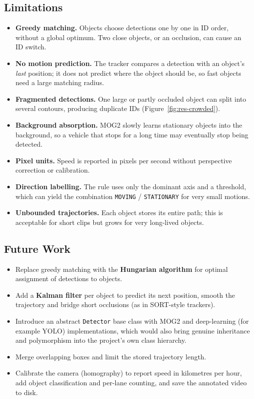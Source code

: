 \documentclass[12pt,a4paper,oneside]{book}
\begin{document}
\subsection{Limitations}
\begin{itemize}
    \item \textbf{Greedy matching.} Objects choose detections one by one in ID order, without a global optimum. Two close objects, or an occlusion, can cause an ID switch.
    \item \textbf{No motion prediction.} The tracker compares a detection with an object's \emph{last} position; it does not predict where the object should be, so fast objects need a large matching radius.
    \item \textbf{Fragmented detections.} One large or partly occluded object can split into several contours, producing duplicate IDs (Figure~\ref{fig:res-crowded}).
    \item \textbf{Background absorption.} MOG2 slowly learns stationary objects into the background, so a vehicle that stops for a long time may eventually stop being detected.
    \item \textbf{Pixel units.} Speed is reported in pixels per second without perspective correction or calibration.
    \item \textbf{Direction labelling.} The rule uses only the dominant axis and a threshold, which can yield the combination \texttt{MOVING} / \texttt{STATIONARY} for very small motions.
    \item \textbf{Unbounded trajectories.} Each object stores its entire path; this is acceptable for short clips but grows for very long-lived objects.
\end{itemize}

\subsection{Future Work}
\begin{itemize}
    \item Replace greedy matching with the \textbf{Hungarian algorithm} for optimal assignment of detections to objects.
    \item Add a \textbf{Kalman filter} per object to predict its next position, smooth the trajectory and bridge short occlusions (as in SORT-style trackers).
    \item Introduce an abstract \texttt{Detector} base class with MOG2 and deep-learning (for example YOLO) implementations, which would also bring genuine inheritance and polymorphism into the project's own class hierarchy.
    \item Merge overlapping boxes and limit the stored trajectory length.
    \item Calibrate the camera (homography) to report speed in kilometres per hour, add object classification and per-lane counting, and save the annotated video to disk.
\end{itemize}
\end{document}
